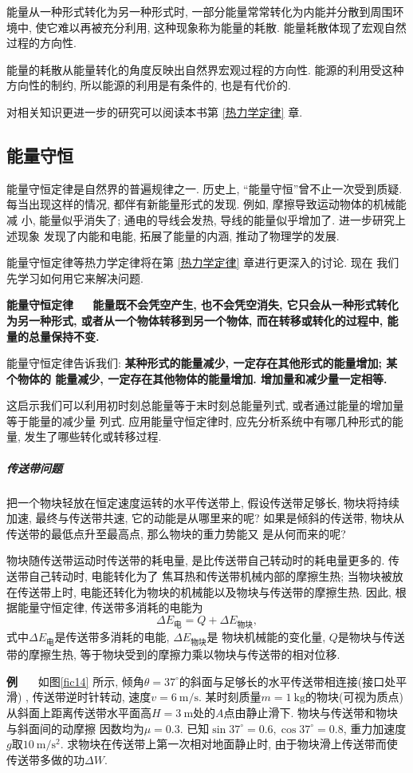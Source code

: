 \documentclass[11pt,a4paper]{ctexbook}
\newcounter{exam}[chapter]
\newcommand{\bre}{\ \ \ }
\newcommand{\examlabel}{\textbf{例\theexam}}
\newenvironment{example}{\bigskip\par\refstepcounter{exam}\examlabel\bre}{\par}
\begin{document}
能量从一种形式转化为另一种形式时,
一部分能量常常转化为内能并分散到周围环境中, 使它难以再被充分利用, 这种现象称为能量的耗散.
能量耗散体现了宏观自然过程的方向性.

能量的耗散从能量转化的角度反映出自然界宏观过程的方向性. 能源的利用受这种
方向性的制约, 所以能源的利用是有条件的, 也是有代价的.

对相关知识更进一步的研究可以阅读本书第 \ref{热力学定律} 章.

\subsection{能量守恒}

能量守恒定律是自然界的普遍规律之一. 历史上, ``能量守恒''曾不止一次受到质疑.
每当出现这样的情况, 都伴有新能量形式的发现. 例如, 摩擦导致运动物体的机械能减
小, 能量似乎消失了; 通电的导线会发热, 导线的能量似乎增加了. 进一步研究上述现象
发现了内能和电能, 拓展了能量的内涵, 推动了物理学的发展.

能量守恒定律等热力学定律将在第 \ref{热力学定律} 章进行更深入的讨论. 现在
我们先学习如何用它来解决问题.

\textbf{能量守恒定律\bre 能量既不会凭空产生, 也不会凭空消失, 它只会从一种形式转化为另一种形式,
或者从一个物体转移到另一个物体, 而在转移或转化的过程中, 能量的总量保持不变.}

能量守恒定律告诉我们: \textbf{某种形式的能量减少, 一定存在其他形式的能量增加; 某个物体的
	能量减少, 一定存在其他物体的能量增加. 增加量和减少量一定相等.}

这启示我们可以利用初时刻总能量等于末时刻总能量列式, 或者通过能量的增加量等于能量的减少量
列式. 应用能量守恒定律时, 应先分析系统中有哪几种形式的能量, 发生了哪些转化或转移过程.

\subparagraph{传送带问题} 把一个物块轻放在恒定速度运转的水平传送带上, 假设传送带足够长, 物块将持续加速, 最终与传送带共速,
它的动能是从哪里来的呢? 如果是倾斜的传送带, 物块从传送带的最低点升至最高点, 那么物块的重力势能又
是从何而来的呢?

物块随传送带运动时传送带的耗电量, 是比传送带自己转动时的耗电量更多的. 传送带自己转动时, 电能转化为了
焦耳热和传送带机械内部的摩擦生热; 当物块被放在传送带上时, 电能还转化为物块的机械能以及物块与传送带的摩擦生热.
因此, 根据能量守恒定律, 传送带多消耗的电能为
$$\Delta E_\text{电} = Q + \Delta E_\text{物块},$$
式中$\Delta E_\text{电}$是传送带多消耗的电能, $\Delta E_\text{物块}$是
物块机械能的变化量, $Q$是物块与传送带的摩擦生热, 等于物块受到的摩擦力乘以物块与传送带的相对位移.

\begin{example}\label{传送带问题}
    如图\ref{fic14} 所示, 倾角$\theta = 37^{\circ}$的斜面与足够长的水平传送带相连接(接口处平滑)
, 传送带逆时针转动, 速度$v = 6\ \mathrm{m/s}$. 某时刻质量$m = 1\ \mathrm{kg}$的物块(可视为质点)
从斜面上距离传送带水平面高$H = 3\ \mathrm{m}$处的$A$点由静止滑下. 物块与传送带和物块与斜面间的动摩擦
因数均为$\mu = 0.3$. 已知$\sin 37^{\circ} = 0.6, \cos 37^{\circ} = 0.8$, 重力加速度$g$取$10\ \mathrm{m/s^2}$.
求物块在传送带上第一次相对地面静止时, 由于物块滑上传送带而使传送带多做的功$\Delta W$.
\end{example}
\end{document}
